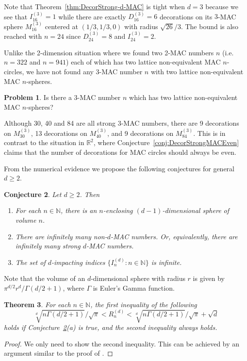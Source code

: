 \documentclass{article}
\theoremstyle{theorem}
\newtheorem{theorem}{Theorem}
\newtheorem{conjecture}[theorem]{Conjecture}
\theoremstyle{definition}
\newtheorem{problem}[theorem]{Problem}
\begin{document}
Note that Theorem~\ref{thm:DecorStrong-d-MAC} is tight when $d=3$ because we see that $I_{16}^{(3)}=1$ while there are exactly $D_{16}^{(3)}=6$ decorations on its $3$-MAC sphere $M_{16}^{(3)}$ centered at $(1/3,1/3,0)$ with radius $\sqrt{26}/3$. The bound is also reached with $n=24$ since $D_{24}^{(3)}=8$ and $I_{24}^{(3)}=2$.


Unlike the 2-dimension situation where we found two 2-MAC numbers $n$ (i.e. $n=322$ and $n=941$) each of which has two lattice non-equivalent MAC $n$-circles, we have not found any 3-MAC number $n$ with two lattice non-equivalent MAC $n$-spheres.

\begin{problem}\label{prob:3-decor}
Is there a 3-MAC number $n$ which has two lattice non-equivalent MAC $n$-spheres?
\end{problem}

Although $30$, 40 and 84 are all strong $3$-MAC numbers, there are 9 decorations on $M_{30}^{(3)}$, 13 decorations on $M_{40}^{(3)}$, and 9 decorations on $M_{84}^{(3)}$. This is in contrast to the situation in ${\mathbb R}^2$, where Conjecture~\ref{conj:DecorStrongMACEven} claims that the number of decorations for MAC circles should always be even.

From the numerical evidence we propose the following conjectures for general $d\ge 2$.
\begin{conjecture}\label{conj:DecorStrong-d-MAC}
Let $d\ge2$. Then
\begin{enumerate}
  \item [(a)] For each $n\in\mathbb N$, there is an $n$-enclosing $(d-1)$-dimensional sphere of volume $n$.

  \item [(b)] There are infinitely many non-$d$-MAC numbers. Or, equivalently, there are infinitely many strong $d$-MAC numbers.

  \item [(c)] The set of $d$-impacting indices $\{I_n^{(d)}:n\in {\mathbb N}\}$ is infinite.
\end{enumerate}
\end{conjecture}


Note that the volume of an $d$-dimensional sphere with radius $r$ is given by $\pi^{d/2} r^d/\Gamma(d/2 + 1)$, where $\Gamma$ is Euler's Gamma function.
\begin{theorem}
For each $n\in\mathbb N$, the first inequality of the following
\begin{equation*}
     \sqrt[d]{n\Gamma(d/2 + 1)}/\sqrt{\pi}< R_n^{(d)} <\sqrt[d]{n\Gamma(d/2 + 1)}/\sqrt{\pi}+\sqrt{d}
\end{equation*}
holds if Conjecture~\ref{conj:DecorStrong-d-MAC}(a) is true, and the second inequality always holds.
\end{theorem}
\begin{proof}
We only need to show the second inequality. This can be achieved by an argument similar to the proof of \cite[Theorem 9]{Zhao2025Aug}.
\end{proof}
\end{document}
